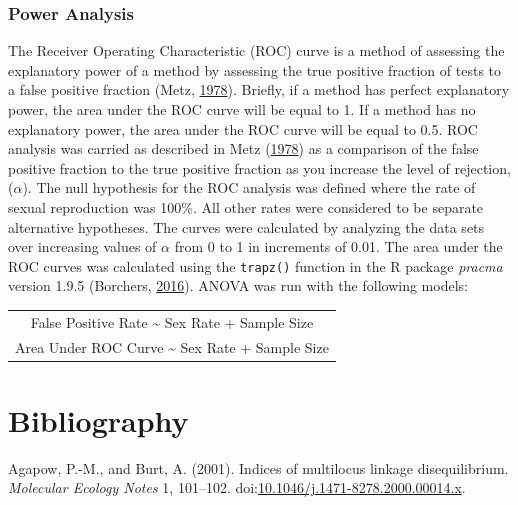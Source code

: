 \documentclass[double,12pt]{beavtex}
\begin{document}
  \subsection{Power Analysis}\label{power-analysis}
  
  The Receiver Operating Characteristic (ROC) curve is a method of
  assessing the explanatory power of a method by assessing the true
  positive fraction of tests to a false positive fraction (Metz,
  \protect\hyperlink{ref-metz1978basic}{1978}). Briefly, if a method has
  perfect explanatory power, the area under the ROC curve will be equal to
  1. If a method has no explanatory power, the area under the ROC curve
  will be equal to 0.5. ROC analysis was carried as described in Metz
  (\protect\hyperlink{ref-metz1978basic}{1978}) as a comparison of the
  false positive fraction to the true positive fraction as you increase
  the level of rejection, (\(\alpha\)). The null hypothesis for the ROC
  analysis was defined where the rate of sexual reproduction was 100\%.
  All other rates were considered to be separate alternative hypotheses.
  The curves were calculated by analyzing the data sets over increasing
  values of \(\alpha\) from 0 to 1 in increments of 0.01. The area under
  the ROC curves was calculated using the \texttt{trapz()} function in the
  R package \emph{pracma} version 1.9.5 (Borchers,
  \protect\hyperlink{ref-borchers2016pracma}{2016}). ANOVA was run with
  the following models:
  
  \begin{longtable}[c]{@{}c@{}}
  \toprule
  False Positive Rate \textasciitilde{} Sex Rate + Sample
  Size\tabularnewline
  Area Under ROC Curve \textasciitilde{} Sex Rate + Sample
  Size\tabularnewline
  \bottomrule
  \end{longtable}
  
  \backmatter
  
  \chapter{Bibliography}\label{bibliography}
  
  \noindent
  
  \setlength{\parindent}{-0.20in} \setlength{\leftskip}{0.20in}
  \setlength{\parskip}{8pt} \singlespacing
  
  \hypertarget{refs}{}
  \hypertarget{ref-Agapowux5f2001}{}
  Agapow, P.-M., and Burt, A. (2001). Indices of multilocus linkage
  disequilibrium. \emph{Molecular Ecology Notes} 1, 101--102.
  doi:\href{https://doi.org/10.1046/j.1471-8278.2000.00014.x}{10.1046/j.1471-8278.2000.00014.x}.
  
\end{document}
